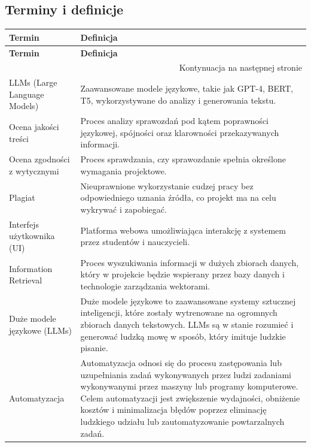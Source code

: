 \documentclass[a4paper, 12pt]{article}
\begin{document}
\subsection{Terminy i definicje}

\footnotesize
\begin{longtable}{|p{}|p{}|}
\hline
\textbf{Termin} & \textbf{Definicja} \\
\hline
\endfirsthead

\hline
\textbf{Termin} & \textbf{Definicja} \\
\hline
\endhead

\hline \multicolumn{2}{|r|}{{Kontynuacja na następnej stronie}} \\ \hline
\endfoot

\hline
\endlastfoot

LLMs (Large Language Models) & Zaawansowane modele językowe, takie jak GPT-4, BERT, T5, wykorzystywane do analizy i generowania tekstu. \\
\hline
Ocena jakości treści & Proces analizy sprawozdań pod kątem poprawności językowej, spójności oraz klarowności przekazywanych informacji. \\
\hline
Ocena zgodności z wytycznymi & Proces sprawdzania, czy sprawozdanie spełnia określone wymagania projektowe. \\
\hline
Plagiat & Nieuprawnione wykorzystanie cudzej pracy bez odpowiedniego uznania źródła, co projekt ma na celu wykrywać i zapobiegać. \\
\hline
Interfejs użytkownika (UI) & Platforma webowa umożliwiająca interakcję z systemem przez studentów i nauczycieli. \\
\hline
Information Retrieval & Proces wyszukiwania informacji w dużych zbiorach danych, który w projekcie będzie wspierany przez bazy danych i technologie zarządzania wektorami. \\
\hline
Duże modele językowe (LLMs) & Duże modele językowe to zaawansowane systemy sztucznej inteligencji, które zostały wytrenowane na ogromnych zbiorach danych tekstowych. LLMs są w stanie rozumieć i generować ludzką mowę w sposób, który imituje ludzkie pisanie. \\
\hline
Automatyzacja & Automatyzacja odnosi się do procesu zastępowania lub uzupełniania zadań wykonywanych przez ludzi zadaniami wykonywanymi przez maszyny lub programy komputerowe. Celem automatyzacji jest zwiększenie wydajności, obniżenie kosztów i minimalizacja błędów poprzez eliminację ludzkiego udziału lub zautomatyzowanie powtarzalnych zadań. \\

\end{longtable}
\end{document}

